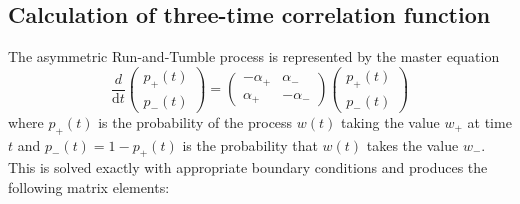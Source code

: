 \documentclass[%
 amsmath,amssymb,
]{revtex4-2}
\newcommand{\rmd}[0]{\mathrm{d}}
\begin{document}
\subsection{Calculation of three-time correlation function}
The asymmetric Run-and-Tumble process is represented by the master equation
\begin{equation}
\frac{d}{\rmd t}\begin{pmatrix}
p_+(t) \\
p_-(t)
\end{pmatrix} =
\begin{pmatrix}
-\alpha_+ & \alpha_- \\
\alpha_+  & -\alpha_-
\end{pmatrix}
\begin{pmatrix}
p_+(t) \\
p_-(t)
\end{pmatrix}
\end{equation}
where $p_+(t)$ is the probability of the process $w(t)$ taking the value $w_+$ at time $t$ and $p_-(t) = 1-p_+(t)$ is the probability that $w(t)$ takes the value $w_-$. This is solved exactly with appropriate boundary conditions and produces the following matrix elements:
\end{document}
